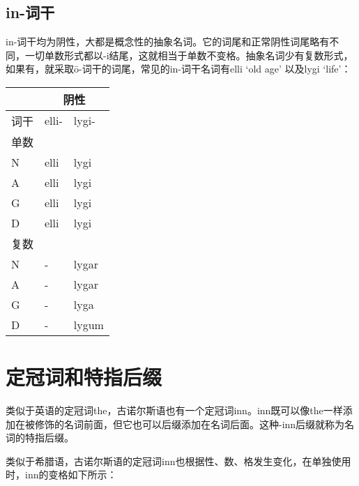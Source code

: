 \subsection{in-词干}
\label{in-词干}

in-词干均为阴性，大都是概念性的抽象名词。它的词尾和正常阴性词尾略有不同，一切单数形式都以-i结尾，这就相当于单数不变格。抽象名词少有复数形式，如果有，就采取ō-词干的词尾，常见的in-词干名词有elli
`old age' 以及lygi `life'：

\begin{longtable}{lll}
  \toprule
     & \multicolumn{2}{c}{\textbf{阴性}}         \\
  \midrule
  \endhead
  \bottomrule
  \endfoot
  词干 & elli-                           & lygi- \\
  单数 &                                 &       \\
  N  & elli                            & lygi  \\
  A  & elli                            & lygi  \\
  G  & elli                            & lygi  \\
  D  & elli                            & lygi  \\
  复数 &                                 &       \\
  N  & -                               & lygar \\
  A  & -                               & lygar \\
  G  & -                               & lyga  \\
  D  & -                               & lygum \\
\end{longtable}

\section{定冠词和特指后缀}
\label{定冠词和特指后缀}

类似于英语的定冠词the，古诺尔斯语也有一个定冠词inn。inn既可以像the一样添加在被修饰的名词前面，但它也可以后缀添加在名词后面。这种-inn后缀就称为名词的特指后缀。

类似于希腊语，古诺尔斯语的定冠词inn也根据性、数、格发生变化，在单独使用时，inn的变格如下所示：

